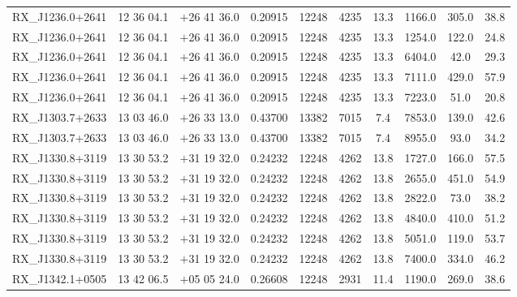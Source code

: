 \begin{landscape}
\begin{center}
\begin{longtable}{l c c c c c c c c c}
RX\_J1236.0+2641  &        12 36 04.1  &         $+$26 41 36.0  &       0.20915  & 12248  &   4235  &       13.3  &      1166.0  &  305.0  &  38.8  \\
RX\_J1236.0+2641  &        12 36 04.1  &         $+$26 41 36.0  &       0.20915  & 12248  &   4235  &       13.3  &      1254.0  &  122.0  &  24.8  \\
RX\_J1236.0+2641  &        12 36 04.1  &         $+$26 41 36.0  &       0.20915  & 12248  &   4235  &       13.3  &      6404.0  &  42.0  &   29.3  \\
RX\_J1236.0+2641  &        12 36 04.1  &         $+$26 41 36.0  &       0.20915  & 12248  &   4235  &       13.3  &      7111.0  &  429.0  &  57.9  \\
RX\_J1236.0+2641  &        12 36 04.1  &         $+$26 41 36.0  &       0.20915  & 12248  &   4235  &       13.3  &      7223.0  &  51.0  &   20.8  \\
RX\_J1303.7+2633  &        13 03 46.0  &         $+$26 33 13.0  &       0.43700  & 13382  &   7015  &       7.4  &       7853.0  &  139.0  &  42.6  \\
RX\_J1303.7+2633  &        13 03 46.0  &         $+$26 33 13.0  &       0.43700  & 13382  &   7015  &       7.4  &       8955.0  &  93.0  &   34.2  \\
RX\_J1330.8+3119  &        13 30 53.2  &         $+$31 19 32.0  &       0.24232  & 12248  &   4262  &       13.8  &      1727.0  &  166.0  &  57.5  \\
RX\_J1330.8+3119  &        13 30 53.2  &         $+$31 19 32.0  &       0.24232  & 12248  &   4262  &       13.8  &      2655.0  &  451.0  &  54.9  \\
RX\_J1330.8+3119  &        13 30 53.2  &         $+$31 19 32.0  &       0.24232  & 12248  &   4262  &       13.8  &      2822.0  &  73.0  &   38.2  \\
RX\_J1330.8+3119  &        13 30 53.2  &         $+$31 19 32.0  &       0.24232  & 12248  &   4262  &       13.8  &      4840.0  &  410.0  &  51.2  \\
RX\_J1330.8+3119  &        13 30 53.2  &         $+$31 19 32.0  &       0.24232  & 12248  &   4262  &       13.8  &      5051.0  &  119.0  &  53.7  \\
RX\_J1330.8+3119  &        13 30 53.2  &         $+$31 19 32.0  &       0.24232  & 12248  &   4262  &       13.8  &      7400.0  &  334.0  &  46.2  \\
RX\_J1342.1+0505  &        13 42 06.5  &         $+$05 05 24.0  &       0.26608  & 12248  &   2931  &       11.4  &      1190.0  &  269.0  &  38.6  \\

\end{longtable}
\end{center}
\end{landscape}
